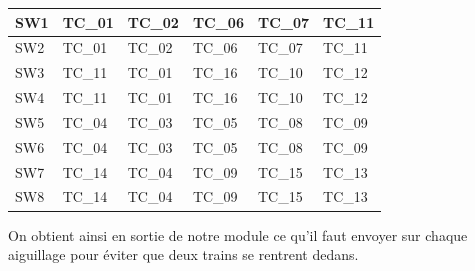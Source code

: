 \begin{center}
\begin{tabular}{|l||lllll|}
  \hline
  SW1 & TC\_01 & TC\_02 & TC\_06 & TC\_07 & TC\_11 \\
  \hline
  SW2 & TC\_01 & TC\_02 & TC\_06 & TC\_07 & TC\_11 \\
  \hline
  SW3 & TC\_11 & TC\_01 & TC\_16 & TC\_10 & TC\_12 \\
  \hline
  SW4 & TC\_11 & TC\_01 & TC\_16 & TC\_10 & TC\_12 \\
  \hline
  SW5 & TC\_04 & TC\_03 & TC\_05 & TC\_08 & TC\_09 \\
  \hline
  SW6 & TC\_04 & TC\_03 & TC\_05 & TC\_08 & TC\_09 \\
  \hline
  SW7 & TC\_14 & TC\_04 & TC\_09 & TC\_15 & TC\_13 \\
  \hline
  SW8 & TC\_14 & TC\_04 & TC\_09 & TC\_15 & TC\_13 \\
  \hline
\end{tabular}
\end{center}

On obtient ainsi en sortie de notre module ce qu'il faut envoyer sur
chaque aiguillage pour éviter que deux trains se  rentrent dedans.

\newpage





